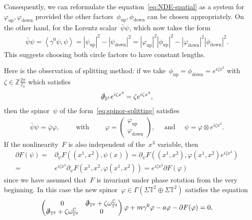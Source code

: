 \documentclass[10pt,a4paper]{amsart}
\newcommand{\p}{\partial}
\newcommand{\C}{\mathbb{C}}
\newcommand{\T}{\mathbb{T}}
\newcommand{\pd}{\slashed{\partial}}
\newcommand{\sph}{\mathbb{S}}
\newcommand{\Abracket}[1]{\left<#1\right>} %
\DeclareMathOperator{\up}{up}
\DeclareMathOperator{\down}{down}
\begin{document}
Consequently, we can reformulate the equation~\eqref{eq:NDE-spatial} as a system for~$\varphi_{\up},\varphi_{\down}$ provided the other factors~$\phi_{\up},\phi_{\down}$ can be chosen appropriately. 
On the other hand, for the Lorentz scalar~$\bar{\psi}\psi$, which now takes the form 
\begin{align}
    \bar{\psi}\psi=\Abracket{\gamma^0\psi,\psi}
    =|\psi_{\up}|^2 - |\psi_{\down}|^2
    =|\varphi_{\up}|^2 |\phi_{\up}|^2
     - |\varphi_{\down}|^2 |\phi_{\down}|^2.
\end{align}
This suggests choosing both circle factors to have constant lengths. 

Here is the observation of splitting method: if we take~$\phi_{\up}=\phi_{\down}=e^{i \zeta x^3}$ with~$\zeta\in\mathbb{Z}\frac{2\pi}{\ell_3}$ which satisfies 
\begin{align}
    \pd_{\sph^1} e^{i\zeta x^3}= \zeta e^{i\zeta x^3},
\end{align}
then the spinor~$\psi$ of the form~\eqref{eq:spinor-splitting} satisfies 
\begin{align}
    \bar{\psi}\psi=\bar{\varphi}\varphi, 
    \qquad \mbox{ with } 
    \qquad 
    \varphi 
    = \begin{pmatrix}
    \varphi_{\up} \\ \varphi_{\down}
    \end{pmatrix}, 
    \quad \mbox{ and } \quad 
    \psi=\varphi\otimes e^{i\zeta x^3
    }.
\end{align}
If the nonlinearity~$F$ is also independent of the~$x^3$ variable, then 
\begin{align}
    \p F(\psi) 
    =& \p_\psi F((x^1,x^2), \psi(x)) 
    = \p_\psi F((x^1,x^2),\varphi(x^1,x^2) e^{i\zeta x^3} )\\
    =& e^{i\zeta x^3}\p_\psi F(x^1,x^2,\varphi(x^1,x^2))
    = e^{i\zeta x^3}\p F(\varphi)
\end{align}
since we have assumed that~$F$ is invariant under phase rotation from the very beginning. 
In this case the new spinor~$\varphi\in \Gamma(\Sigma \T^2\oplus \Sigma \T^2)$ satisfies the equation 
\begin{align}
    \begin{pmatrix}
        0 & \pd_{\T^2} + \zeta \omega_{\T^2}^{\C} \\ \pd_{\T^2}+ \zeta \omega_{\T^2}^{\C} & 0
    \end{pmatrix}\varphi 
    + m\gamma^0\varphi - a\varphi -\p F(\varphi)=0, 
\end{align}
\end{document}
